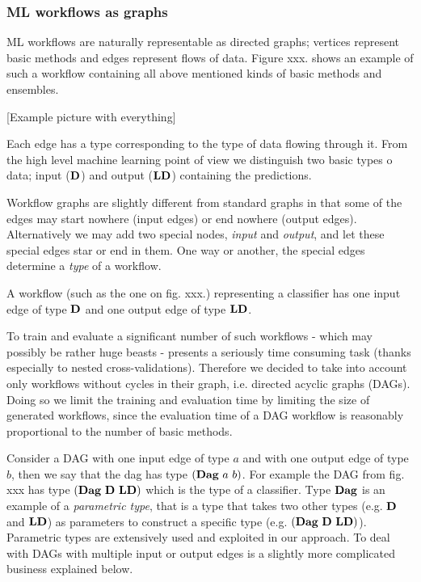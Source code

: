 \documentclass[a4paper,oneside]{memoir}
\begin{document}
\subsubsection{ML workflows as graphs}
ML workflows are naturally representable as directed graphs; vertices represent basic methods and edges represent flows of data.
Figure xxx. shows an example of such a workflow containing all above mentioned kinds of basic methods and ensembles.

[Example picture with everything]

Each edge has a type corresponding to the type of data flowing through it. 
From the high level machine learning point of view we distinguish two basic types o data;
input \Dlong ($\textbf{D}$) and output \LDlong ($\textbf{LD}$) containing the predictions.

Workflow graphs are slightly different from standard graphs in that some of the edges may start nowhere (input edges) or end nowhere (output edges). 
Alternatively we may add two special nodes, \textit{input} and \textit{output}, and let these special edges star or end in them.
One way or another, the special edges determine a \textit{type} of a workflow.

A workflow (such as the one on fig. xxx.) representing a classifier has one input edge of type $\textbf{D}$ and one output edge of type $\textbf{LD}$.

To train and evaluate a significant number of such workflows - which may possibly be rather huge beasts -  presents a seriously time consuming task (thanks especially to nested cross-validations). Therefore we decided to take into account only workflows without cycles in their graph, i.e. directed acyclic graphs (DAGs). Doing so we limit the training and evaluation time by limiting the size of generated workflows, since the evaluation time of a DAG workflow is reasonably proportional to the number of basic methods.

Consider a DAG with one input edge of type $a$ and with one output edge of type $b$, then we say that the dag has type $(\textbf{Dag}\ a\ b)$. 
For example the DAG from fig. xxx has type $(\textbf{Dag}\ \textbf{D}\ \textbf{LD})$ which is the type of a classifier.
Type $\textbf{Dag}$ is an example of a \textit{parametric type}, that is a type that takes two other types (e.g. $\textbf{D}$ and $\textbf{LD}$) as parameters to construct a specific type (e.g. $(\textbf{Dag}\ \textbf{D}\ \textbf{LD})$).
Parametric types are extensively used and exploited in our approach.
To deal with DAGs with multiple input or output edges is a slightly more complicated business explained below.
\end{document}

